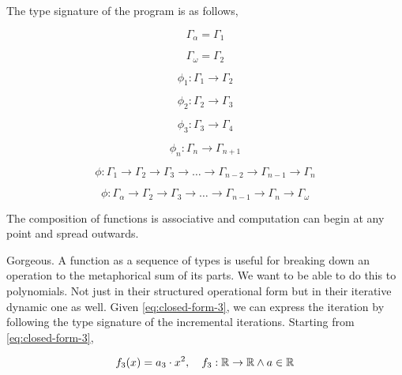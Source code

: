 \documentclass[12pt]{article}
\begin{document}
The type signature of the program is as follows,

\begin{equation}
    \Gamma_\alpha = \Gamma_1
\end{equation}

\begin{equation}
    \Gamma_\omega = \Gamma_2
\end{equation}

\begin{equation}
    \phi_1: \Gamma_1 \rightarrow \Gamma_2
\end{equation}

\begin{equation}
    \phi_2: \Gamma_2 \rightarrow \Gamma_3
\end{equation}

\begin{equation}
    \phi_3: \Gamma_3 \rightarrow \Gamma_4
\end{equation}

\begin{equation}
    \phi_n: \Gamma_n \rightarrow \Gamma_{n+1}
\end{equation}

\begin{equation}
    \phi: \Gamma_1 \rightarrow \Gamma_2 \rightarrow \Gamma_3 \rightarrow \dots \rightarrow \Gamma_{n-2} \rightarrow \Gamma_{n-1} \rightarrow \Gamma_n
\end{equation}

\begin{equation}
    \phi: \Gamma_\alpha \rightarrow \Gamma_2 \rightarrow \Gamma_3 \rightarrow \dots \rightarrow \Gamma_{n-1} \rightarrow \Gamma_n \rightarrow \Gamma_\omega
\end{equation}

The composition of functions is associative and computation can begin at any
point and spread outwards.

Gorgeous. A function as a sequence of types is useful for breaking down an
operation to the metaphorical sum of its parts. We want to be able to do this
to polynomials. Not just in their structured operational form but in their
iterative dynamic one as well. Given \ref{eq:closed-form-3}, we can express the
iteration by following the type signature of the incremental iterations.
Starting from \ref{eq:closed-form-3},

\begin{equation}
    f_3(x) = a_3 \cdot x^2, \quad f_3: \mathbb{R} \rightarrow \mathbb{R} \land a \in \mathbb{R} \notag
\end{equation}
\end{document}
